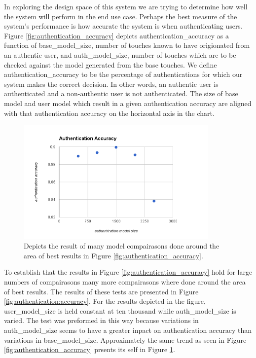\documentclass{acm_proc_article-sp}
\begin{document}
%
In exploring the design space of this system we are trying to determine how well the system will perform in the end use case. Perhaps the best measure of the system's performance is how accurate the system is when authenticating users. Figure \ref{fig:authentication_accuracy} depicts authentication\_accuracy as a function of base\_model\_size, number of touches known to have origionated from an authentic user, and auth\_model\_size, number of touches which are to be checked against the model generated from the base touches. We define authentication\_accuracy to be the percentage of authentications for which our system makes the correct decision. In other words, an authentic user is authenticated and a non-authentic user is not authenticated. The size of base model and user model which result in a given authentication accuracy are aligned with that authentication accuracy on the horizontal axis in the chart. 

\begin{figure}
\centering
\includegraphics[width=3.9in]{extensive_authentication_accuracy.png}
\caption{Depicts the result of many model compairasons done around the area of best results in Figure \ref{fig:authentication_accuracy}.}
\label{fig:extensive_authentication_accuracy}
\end{figure}

%
To establish that the results in Figure \ref{fig:authentication_accuracy} hold for large numbers of compairasons many more compairasons where done around the area of best results. The results of these tests are presented in Figure \ref{fig:authentication:accuracy}. For the results depicted in the figure, user\_model\_size is held constant at ten thousand while auth\_model\_size is varied. The test was preformed in this way because variations in auth\_model\_size seems to have a greater inpact on authentication accuracy than variations in base\_model\_size. Approximately the same trend as seen in Figure \ref{fig:authentication_accuracy} prsents its self in Figure \ref{fig:extensive_authentication_accuracy}.
\end{document}
